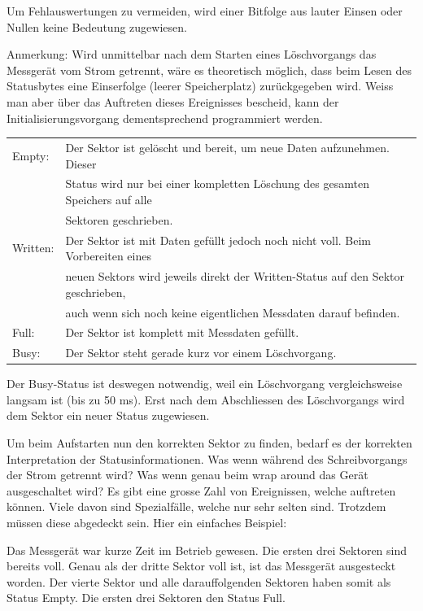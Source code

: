 Um Fehlauswertungen zu vermeiden, wird einer Bitfolge aus lauter Einsen oder Nullen keine Bedeutung zugewiesen. 

Anmerkung: Wird unmittelbar nach dem Starten eines Löschvorgangs das Messgerät vom Strom getrennt, wäre es theoretisch möglich, dass beim Lesen des Statusbytes eine Einserfolge (leerer Speicherplatz) zurückgegeben wird. Weiss man aber über das Auftreten dieses Ereignisses bescheid, kann der Initialisierungsvorgang dementsprechend programmiert werden.

\begin{table}[H]
\begin{tabular}{ll}
Empty:			&   Der Sektor ist gelöscht und bereit, um neue Daten 								aufzunehmen. Dieser \\
				&   Status wird nur bei einer 														kompletten Löschung des gesamten Speichers auf alle \\
				&	Sektoren geschrieben.\\
Written:		&   Der Sektor ist mit Daten gefüllt jedoch noch nicht 						voll. Beim Vorbereiten eines \\
				&   neuen Sektors wird 	jeweils direkt der Written-Status 							auf den Sektor geschrieben,\\
				&   auch wenn sich noch keine eigentlichen 										Messdaten darauf befinden.\\
Full:			&   Der Sektor ist komplett mit Messdaten gefüllt.\\
Busy:			&   Der Sektor steht gerade kurz vor einem Löschvorgang.\\
\end{tabular}
\end{table}

Der Busy-Status ist deswegen notwendig, weil ein Löschvorgang vergleichsweise langsam ist (bis zu 50 ms). Erst nach dem Abschliessen des Löschvorgangs wird dem Sektor ein neuer Status zugewiesen.

Um beim Aufstarten nun den korrekten Sektor zu finden, bedarf es der korrekten Interpretation der Statusinformationen. Was wenn während des Schreibvorgangs der Strom getrennt wird? Was wenn genau beim \glqq wrap around\grqq{}   das Gerät ausgeschaltet wird? Es gibt eine grosse Zahl von Ereignissen, welche auftreten können. Viele davon sind Spezialfälle, welche nur sehr selten sind. Trotzdem müssen diese abgedeckt sein. Hier ein einfaches Beispiel:

Das Messgerät war kurze Zeit im Betrieb gewesen. Die ersten drei Sektoren sind bereits voll. Genau als der dritte Sektor voll ist, ist das Messgerät ausgesteckt worden. Der vierte Sektor und alle darauffolgenden Sektoren haben somit als Status \glqq Empty\grqq . Die ersten drei Sektoren den Status  \glqq Full\grqq .

